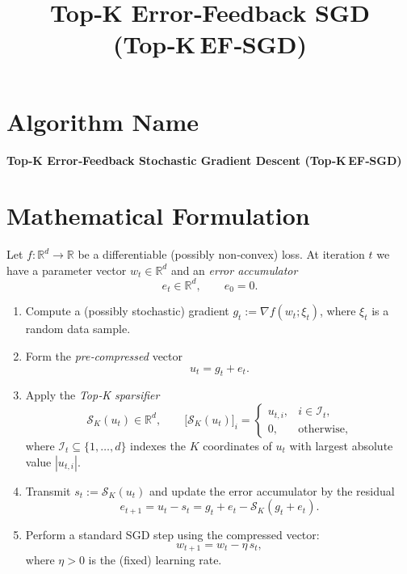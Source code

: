 \documentclass[11pt]{article}
\title{Top‑K Error‑Feedback SGD (Top‑K EF‑SGD)}
\author{}
\date{}
\begin{document}
\maketitle

\section*{Algorithm Name}
\textbf{Top‑K Error‑Feedback Stochastic Gradient Descent (Top‑K EF‑SGD)}

\section*{Mathematical Formulation}
Let $f:\mathbb{R}^{d}\rightarrow\mathbb{R}$ be a differentiable (possibly non‑convex) loss.  
At iteration $t$ we have a parameter vector $w_{t}\in\mathbb{R}^{d}$ and an \emph{error accumulator}
\[
e_{t}\in\mathbb{R}^{d},\qquad e_{0}=0.
\]

\begin{enumerate}[label=\arabic*)]
\item Compute a (possibly stochastic) gradient $g_{t}:=\nabla f(w_{t};\xi_{t})$, where $\xi_{t}$ is a random data sample.
\item Form the \emph{pre‑compressed} vector
\[
u_{t}=g_{t}+e_{t}.
\]
\item Apply the \emph{Top‑K sparsifier}
\[
\mathcal{S}_{K}(u_{t})\in\mathbb{R}^{d},\qquad
\big[\mathcal{S}_{K}(u_{t})\big]_{i}=
\begin{cases}
u_{t,i}, & i\in\mathcal{I}_{t},\\[2mm]
0, & \text{otherwise},
\end{cases}
\]
where $\mathcal{I}_{t}\subseteq\{1,\dots,d\}$ indexes the $K$ coordinates of $u_{t}$ with largest absolute value $|u_{t,i}|$.
\item Transmit $s_{t}:=\mathcal{S}_{K}(u_{t})$ and update the error accumulator by the residual
\[
e_{t+1}=u_{t}-s_{t}=g_{t}+e_{t}-\mathcal{S}_{K}(g_{t}+e_{t}).
\]
\item Perform a standard SGD step using the compressed vector:
\[
w_{t+1}=w_{t}-\eta\, s_{t},
\]
where $\eta>0$ is the (fixed) learning rate.
\end{enumerate}
\end{document}
